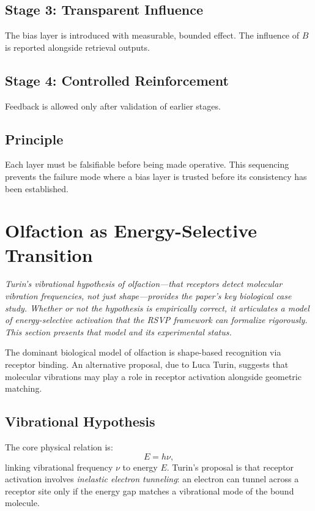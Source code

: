 \documentclass[12pt,a4paper]{article}
\begin{document}
\subsection{Stage 3: Transparent Influence}
The bias layer is introduced with measurable, bounded effect. The influence of $B$ is reported alongside retrieval outputs.

\subsection{Stage 4: Controlled Reinforcement}
Feedback is allowed only after validation of earlier stages.

\subsection{Principle}
Each layer must be falsifiable before being made operative. This sequencing prevents the failure mode where a bias layer is trusted before its consistency has been established.

\section{Olfaction as Energy-Selective Transition}
\label{sec:olfaction_physics}

\textit{Turin's vibrational hypothesis of olfaction---that receptors detect molecular vibration frequencies, not just shape---provides the paper's key biological case study. Whether or not the hypothesis is empirically correct, it articulates a model of energy-selective activation that the RSVP framework can formalize rigorously. This section presents that model and its experimental status.}

The dominant biological model of olfaction is shape-based recognition via receptor binding. An alternative proposal, due to Luca Turin, suggests that molecular vibrations may play a role in receptor activation alongside geometric matching.

\subsection{Vibrational Hypothesis}

The core physical relation is:
\[
E = h\nu,
\]
linking vibrational frequency $\nu$ to energy $E$. Turin's proposal is that receptor activation involves \emph{inelastic electron tunneling}: an electron can tunnel across a receptor site only if the energy gap matches a vibrational mode of the bound molecule.
\end{document}
